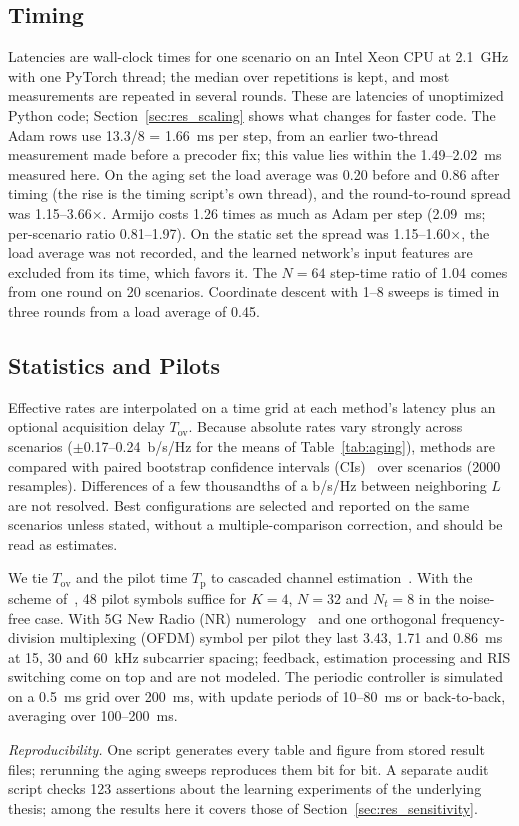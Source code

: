\subsection{Timing}
Latencies are wall-clock times for one scenario on an Intel Xeon CPU at 2.1~GHz with one PyTorch thread; the median over repetitions is kept, and most measurements are repeated in several rounds. These are latencies of unoptimized Python code; Section~\ref{sec:res_scaling} shows what changes for faster code. The Adam rows use 13.3/8 = 1.66~ms per step, from an earlier two-thread measurement made before a precoder fix; this value lies within the 1.49--2.02~ms measured here. On the aging set the load average was 0.20 before and 0.86 after timing (the rise is the timing script's own thread), and the round-to-round spread was 1.15--3.66$\times$. Armijo costs 1.26 times as much as Adam per step (2.09~ms; per-scenario ratio 0.81--1.97). On the static set the spread was 1.15--1.60$\times$, the load average was not recorded, and the learned network's input features are excluded from its time, which favors it. The $N=64$ step-time ratio of 1.04 comes from one round on 20 scenarios. Coordinate descent with 1--8 sweeps is timed in three rounds from a load average of 0.45.

\subsection{Statistics and Pilots}
Effective rates are interpolated on a time grid at each method's latency plus an optional acquisition delay $T_{\mathrm{ov}}$. Because absolute rates vary strongly across scenarios ($\pm$0.17--0.24~b/s/Hz for the means of Table~\ref{tab:aging}), methods are compared with paired bootstrap confidence intervals (CIs)~\cite{Efron1993} over scenarios (2000 resamples). Differences of a few thousandths of a b/s/Hz between neighboring $L$ are not resolved. Best configurations are selected and reported on the same scenarios unless stated, without a multiple-comparison correction, and should be read as estimates.

We tie $T_{\mathrm{ov}}$ and the pilot time $T_{\mathrm{p}}$ to cascaded channel estimation~\cite{Zheng2022COMST}. With the scheme of~\cite{Wang2020TWC}, 48 pilot symbols suffice for $K=4$, $N=32$ and $N_t=8$ in the noise-free case. With 5G New Radio (NR) numerology~\cite{3gpp_nr_phy} and one orthogonal frequency-division multiplexing (OFDM) symbol per pilot they last 3.43, 1.71 and 0.86~ms at 15, 30 and 60~kHz subcarrier spacing; feedback, estimation processing and RIS switching come on top and are not modeled. The periodic controller is simulated on a 0.5~ms grid over 200~ms, with update periods of 10--80~ms or back-to-back, averaging over 100--200~ms.

\emph{Reproducibility.} One script generates every table and figure from stored result files; rerunning the aging sweeps reproduces them bit for bit. A separate audit script checks 123 assertions about the learning experiments of the underlying thesis; among the results here it covers those of Section~\ref{sec:res_sensitivity}.
